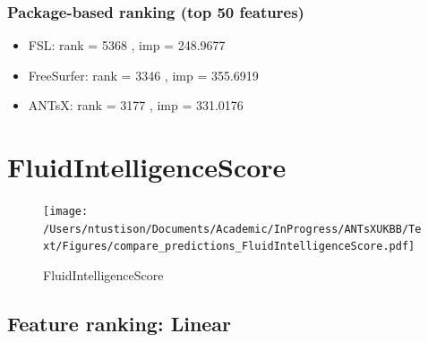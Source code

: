 \documentclass[
  10pt,
]{article}
\begin{document}
\hypertarget{package-based-ranking-top-50-features}{%
\subsubsection{Package-based ranking (top 50
features)}\label{package-based-ranking-top-50-features}}

\begin{itemize}
\item
  FSL: rank = 5368 , imp = 248.9677
\item
  FreeSurfer: rank = 3346 , imp = 355.6919
\item
  ANTsX: rank = 3177 , imp = 331.0176
\end{itemize}

\clearpage

\hypertarget{fluidintelligencescore}{%
\section{FluidIntelligenceScore}\label{fluidintelligencescore}}

\begin{figure}
\centering
\texttt{[image: /Users/ntustison/Documents/Academic/InProgress/ANTsXUKBB/Text/Figures/compare\_predictions\_FluidIntelligenceScore.pdf]}
\caption{FluidIntelligenceScore}
\end{figure}

\hypertarget{feature-ranking-linear-1}{%
\subsection{Feature ranking: Linear}\label{feature-ranking-linear-1}}
\end{document}
